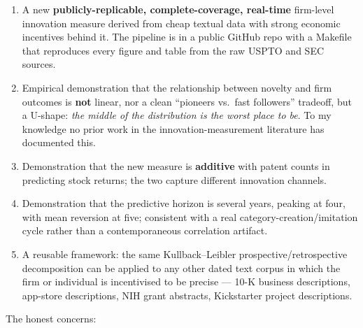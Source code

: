 \documentclass[11pt]{article}
\begin{document}
\begin{enumerate}
  \item A new \textbf{publicly-replicable, complete-coverage,
        real-time} firm-level innovation measure derived from
        cheap textual data with strong economic incentives behind
        it. The pipeline is in a public GitHub repo with a
        Makefile that reproduces every figure and table from the
        raw USPTO and SEC sources.
  \item Empirical demonstration that the relationship between
        novelty and firm outcomes is \textbf{not} linear, nor a
        clean ``pioneers vs.\ fast followers'' tradeoff, but a
        U-shape: \emph{the middle of the distribution is the
        worst place to be}. To my knowledge no prior work in the
        innovation-measurement literature has documented this.
  \item Demonstration that the new measure is \textbf{additive}
        with patent counts in predicting stock returns; the two
        capture different innovation channels.
  \item Demonstration that the predictive horizon is several
        years, peaking at four, with mean reversion at five;
        consistent with a real category-creation/imitation cycle
        rather than a contemporaneous correlation artifact.
  \item A reusable framework: the same Kullback--Leibler
        prospective/retrospective decomposition can be applied to
        any other dated text corpus in which the firm or
        individual is incentivised to be precise --- 10-K business
        descriptions, app-store descriptions, NIH grant abstracts,
        Kickstarter project descriptions.
\end{enumerate}

The honest concerns:
\end{document}
